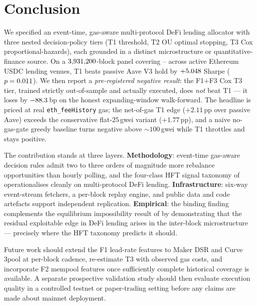 \section{Conclusion}
\label{sec:conclusion}

We specified an event-time, gas-aware multi-protocol DeFi lending
allocator with three nested decision-policy tiers (T1 threshold,
T2 OU optimal stopping, T3 Cox proportional-hazards), each
grounded in a distinct microstructure or quantitative-finance
source.  On a $3{,}931{,}200$-block panel covering
\DataStart{}--\DataEnd{} across \NProtocols{} active Ethereum
USDC lending venues, T1 beats passive Aave V3 hold by
$+5.048$ Sharpe ($p = 0.011$).  We then report a
\emph{pre-registered negative result}: the F1$+$F3 Cox T3 tier,
trained strictly out-of-sample and actually executed, does
\emph{not} beat T1 --- it loses by $-88.3$\,bp on the
honest expanding-window walk-forward.  The headline is priced at real
\texttt{eth\_feeHistory} gas; the net-of-gas T1 edge ($+2.11$\,pp over
passive Aave) exceeds the conservative flat-$25$\,gwei variant
($+1.77$\,pp), and a naive no-gas-gate greedy baseline turns negative
above $\sim 100$\,gwei while T1 throttles and stays positive.

The contribution stands at three layers.  \textbf{Methodology}:
event-time gas-aware decision rules admit two to three orders of
magnitude more rebalance opportunities than hourly polling, and
the four-class HFT signal taxonomy of \cite{mackenzie2021}
operationalises cleanly on multi-protocol DeFi lending.
\textbf{Infrastructure}: six-way event-stream fetchers, a
per-block replay engine, and public data and code artefacts support
independent replication.  \textbf{Empirical}: the binding
finding complements the equilibrium impossibility result of
\cite{halpern2024fair} by demonstrating that the residual
exploitable edge in DeFi lending arises in the inter-block
microstructure --- precisely where the HFT taxonomy predicts it
should.

Future work should extend the F1 lead-rate features to Maker DSR
and Curve 3pool at per-block cadence, re-estimate T3 with observed
gas costs, and incorporate F2 mempool features once sufficiently
complete historical coverage is available.  A separate prospective
validation study should then evaluate execution quality in a
controlled testnet or paper-trading setting before any claims are
made about mainnet deployment.
